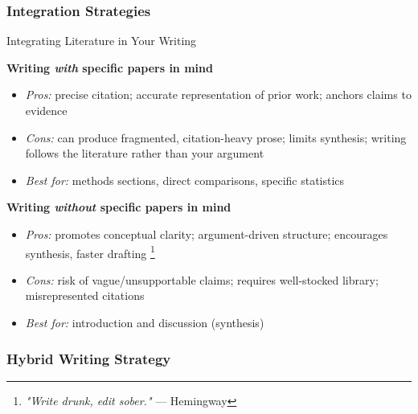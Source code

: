 \documentclass{beamer}
\begin{document}
\subsubsection{Integration Strategies}
\begin{frame}{Integrating Literature in Your Writing}

  \footnotesize

  \textbf{Writing \textit{with} specific papers in mind}
  \begin{itemize}
    \item \emph{Pros:} precise citation; accurate representation
      of prior work; anchors claims to evidence
    \item \emph{Cons:} can produce fragmented,
      citation-heavy prose; limits synthesis; writing
      follows the literature rather than your argument
    \item \emph{Best for:} methods sections, direct
      comparisons, specific statistics
  \end{itemize}

  \medskip
  \textbf{Writing \textit{without} specific papers in mind}
  \begin{itemize}
    \item \emph{Pros:} promotes conceptual clarity;
      argument-driven structure; encourages synthesis, faster drafting%
      {\scriptsize \footnote{\textit{"Write drunk, edit sober."} --- Hemingway}}
    \item \emph{Cons:} risk of vague/unsupportable claims;
      requires well-stocked library; misrepresented citations
    \item \emph{Best for:} introduction and discussion (synthesis)
  \end{itemize}

\end{frame}


\subsubsection{Hybrid Writing Strategy}
\end{document}
